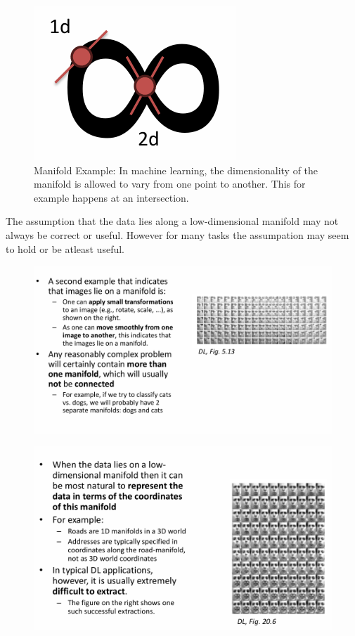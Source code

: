 \documentclass[../Main.tex]{subfiles}
\begin{document}
\begin{figure}[H]
    \centering
    \includegraphics[width=0.25\linewidth]{Images/manifold-example-2.png}
    \caption{Manifold Example: In machine learning, the dimensionality of the manifold is 
    allowed to vary from one point to another. This for example happens at an intersection.}
\end{figure}

The assumption that the data lies along a low-dimensional manifold 
may not always be correct or useful.
However for many tasks the assumpation may seem to hold or be atleast useful.

\begin{figure}[H]
    \centering
    \includegraphics[width=1\linewidth]{Images/manifold-example-3.png}
\end{figure}
\begin{figure}[H]
    \centering
    \includegraphics[width=0.75\linewidth]{Images/manifold-example-4.png}
\end{figure}
\end{document}
